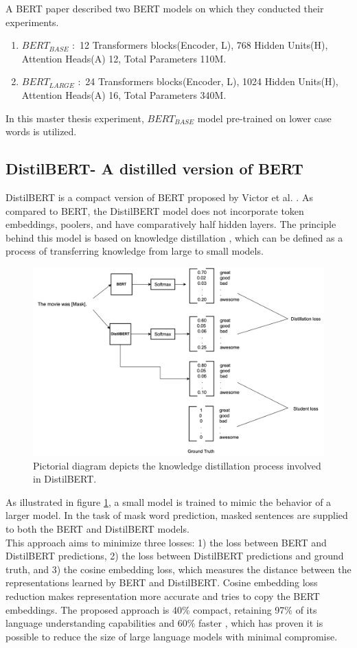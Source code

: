 \documentclass[%
	BCOR=8mm, %
	DIV=12,
	toc=bibliography, %
	toc=listof, %
	oneside, %
	egregdoesnotlikesansseriftitles, %
	]{scrbook}
\begin{document}
A BERT paper \cite{devlin_bert_2019-1} described two BERT models on which they conducted their experiments. 
\begin{enumerate}
    \item $BERT_{BASE}$ $:$ 12 Transformers blocks(Encoder, L), 768 Hidden Units(H), Attention Heads(A) 12, Total Parameters 110M.
    \item $BERT_{LARGE}$ $:$ 24 Transformers blocks(Encoder, L), 1024 Hidden Units(H), Attention Heads(A) 16, Total Parameters 340M.
\end{enumerate}
In this master thesis experiment, $BERT_{BASE}$ model  pre-trained on lower case words is utilized. 

\subsection{DistilBERT- A distilled version of BERT}
DistilBERT is a compact version of BERT proposed by Victor et al. \cite{sanh_distilbert_2020}. As compared to BERT, the DistilBERT model does not incorporate token embeddings, poolers, and have comparatively half hidden layers. The principle behind this model is based on knowledge distillation \cite{hinton_distilling_2015}, which can be defined as a process of transferring knowledge from large  to small models. \\
\begin{figure}[H]
    \centering
    \includegraphics[width=0.8\linewidth]{img/DistilBERT.png}
    \caption[Diagram of DistilBERT training.]{ Pictorial diagram depicts the knowledge distillation process involved in  DistilBERT.}
    \label{fig:DistilBERT}
\end{figure}
As illustrated in figure \ref{fig:DistilBERT}, a small model is trained to mimic the behavior of a larger model. In the task of mask word prediction, masked sentences are supplied to both the BERT and DistilBERT models.\\
This approach aims to minimize three losses: 1) the loss between BERT and DistilBERT predictions, 2) the loss between DistilBERT predictions and ground truth, and 3) the cosine embedding loss, which measures the distance between the representations learned by BERT and DistilBERT. Cosine embedding loss reduction makes representation more accurate and tries to copy the BERT embeddings. The proposed approach is 40\% compact, retaining 97\% of its language understanding capabilities and 60\% faster \cite{sanh_distilbert_2020} , which has proven it is possible to reduce the size of large language models with minimal compromise.
\end{document}
